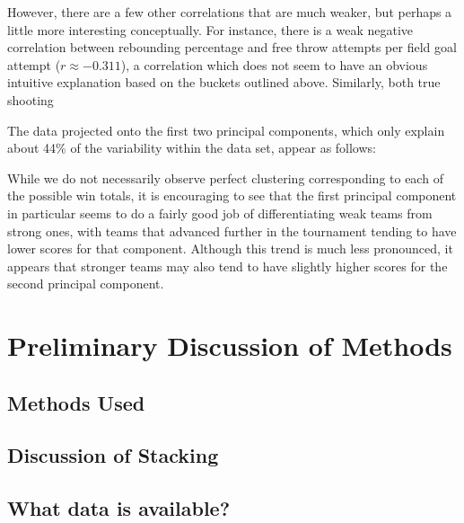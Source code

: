 \documentclass[10pt,a4paper, hidelinks]{article} %
\begin{document}
However, there are a few other correlations that are much weaker, but perhaps a little more interesting conceptually. For instance, there is a weak negative correlation between rebounding percentage and free throw attempts per field goal attempt ($r \approx -0.311$), a correlation which does not seem to have an obvious intuitive explanation based on the buckets outlined above. Similarly, both true shooting 

The data projected onto the first two principal components, which only explain about 44\% of the variability within the data set, appear as follows:


While we do not necessarily observe perfect clustering corresponding to each of the possible win totals, it is encouraging to see that the first principal component in particular seems to do a fairly good job of differentiating weak teams from strong ones, with teams that advanced further in the tournament tending to have lower scores for that component. Although this trend is much less pronounced, it appears that stronger teams may also tend to have slightly higher scores for the second principal component. 

\section{Preliminary Discussion of Methods}

\subsection{Methods Used}
\lipsum
\subsection{Discussion of Stacking}
\lipsum
\subsection{What data is available?}
\lipsum
\end{document}
